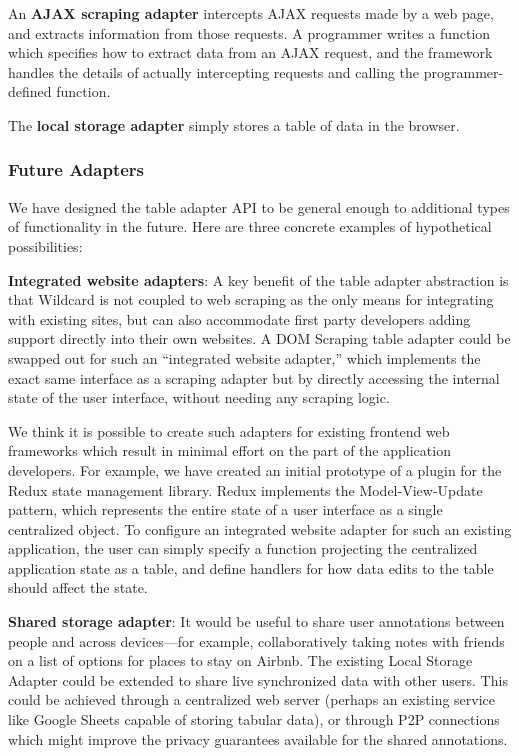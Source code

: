 \documentclass[sigplan,10pt,anonymous,review]{acmart}
\begin{document}
An \textbf{AJAX scraping adapter} intercepts AJAX requests made by a web
page, and extracts information from those requests. A programmer writes
a function which specifies how to extract data from an AJAX request, and
the framework handles the details of actually intercepting requests and
calling the programmer-defined function.

The \textbf{local storage adapter} simply stores a table of data in the
browser.

\hypertarget{future-adapters}{%
\subsubsection{Future Adapters}\label{future-adapters}}

We have designed the table adapter API to be general enough to
additional types of functionality in the future. Here are three concrete
examples of hypothetical possibilities:

\textbf{Integrated website adapters}: A key benefit of the table adapter
abstraction is that Wildcard is not coupled to web scraping as the only
means for integrating with existing sites, but can also accommodate
first party developers adding support directly into their own websites.
A DOM Scraping table adapter could be swapped out for such an
``integrated website adapter,'' which implements the exact same
interface as a scraping adapter but by directly accessing the internal
state of the user interface, without needing any scraping logic.

We think it is possible to create such adapters for existing frontend
web frameworks which result in minimal effort on the part of the
application developers. For example, we have created an initial
prototype of a plugin for the Redux state management library. Redux
implements the Model-View-Update pattern, which represents the entire
state of a user interface as a single centralized object. To configure
an integrated website adapter for such an existing application, the user
can simply specify a function projecting the centralized application
state as a table, and define handlers for how data edits to the table
should affect the state.

\textbf{Shared storage adapter}: It would be useful to share user
annotations between people and across devices---for example,
collaboratively taking notes with friends on a list of options for
places to stay on Airbnb. The existing Local Storage Adapter could be
extended to share live synchronized data with other users. This could be
achieved through a centralized web server (perhaps an existing service
like Google Sheets capable of storing tabular data), or through P2P
connections which might improve the privacy guarantees available for the
shared annotations.
\end{document}
